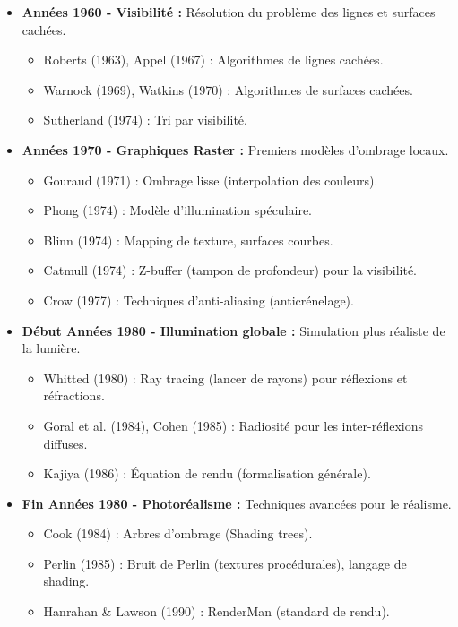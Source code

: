 \documentclass{article}
\begin{document}
\begin{itemize}
    \item \textbf{Années 1960 - Visibilité :} Résolution du problème des lignes et surfaces cachées.
    \begin{itemize}
        \item Roberts (1963), Appel (1967) : Algorithmes de lignes cachées.
        \item Warnock (1969), Watkins (1970) : Algorithmes de surfaces cachées.
        \item Sutherland (1974) : Tri par visibilité.
    \end{itemize}
    \item \textbf{Années 1970 - Graphiques Raster :} Premiers modèles d'ombrage locaux.
    \begin{itemize}
        \item Gouraud (1971) : Ombrage lisse (interpolation des couleurs).
        \item Phong (1974) : Modèle d'illumination spéculaire.
        \item Blinn (1974) : Mapping de texture, surfaces courbes.
        \item Catmull (1974) : Z-buffer (tampon de profondeur) pour la visibilité.
        \item Crow (1977) : Techniques d'anti-aliasing (anticrénelage).
    \end{itemize}
    \item \textbf{Début Années 1980 - Illumination globale :} Simulation plus réaliste de la lumière.
    \begin{itemize}
        \item Whitted (1980) : Ray tracing (lancer de rayons) pour réflexions et réfractions.
        \item Goral et al. (1984), Cohen (1985) : Radiosité pour les inter-réflexions diffuses.
        \item Kajiya (1986) : Équation de rendu (formalisation générale).
    \end{itemize}
    \item \textbf{Fin Années 1980 - Photoréalisme :} Techniques avancées pour le réalisme.
    \begin{itemize}
        \item Cook (1984) : Arbres d'ombrage (Shading trees).
        \item Perlin (1985) : Bruit de Perlin (textures procédurales), langage de shading.
        \item Hanrahan \& Lawson (1990) : RenderMan (standard de rendu).

\end{itemize}
\end{itemize}
\end{document}
